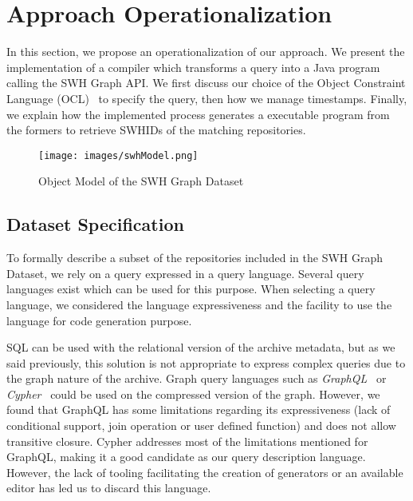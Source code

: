 \section{Approach Operationalization}
\label{sec:operationalization}
In this section, we propose an operationalization of our approach.
We present the implementation of a compiler which transforms a query into a Java program calling the SWH Graph API.
We first discuss our choice of the Object Constraint Language (OCL)~\cite{DBLP:conf/sfm/CabotG12} to specify the query, then how we manage timestamps.
Finally, we explain how the implemented process generates a executable program from the formers to retrieve SWHIDs of the matching repositories.

\begin{figure*}
    \center \texttt{[image: images/swhModel.png]}

    \caption{Object Model of the SWH Graph Dataset}
    \vspace{-5 pt}

    \label{fig:swhModel} 

\end{figure*}

\subsection{Dataset Specification}

To formally describe a subset of the repositories included in the SWH Graph Dataset, we rely on a query expressed in a query language.
Several query languages exist which can be used for this purpose.
When selecting a query language, we considered the language expressiveness and the facility to use the language for code generation purpose.

SQL can be used with the relational version of the archive metadata, but as we said previously, this solution is not appropriate to express complex queries due to the graph nature of the archive.
Graph query languages such as \emph{GraphQL}~\cite{DBLP:conf/www/Hartig018} or \emph{Cypher}~\cite{DBLP:conf/sigmod/FrancisGGLLMPRS18} could be used on the compressed version of the graph.
However, we found that GraphQL has some limitations regarding its expressiveness (lack of conditional support, join operation or user defined function) and does not allow transitive closure.
Cypher addresses most of the limitations mentioned for GraphQL, making it a good candidate as our query description language. 
However, the lack of tooling facilitating the creation of generators or an available editor has led us to discard this language. 

